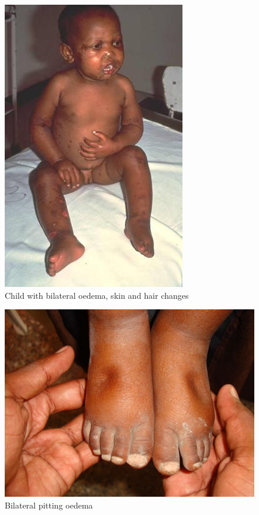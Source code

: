 \documentclass[12pt,]{book}
\theoremstyle{definition}
\theoremstyle{definition}
\theoremstyle{definition}
\theoremstyle{remark}
\begin{document}
\begin{figure}

{\centering \includegraphics{images/oedema01} 

}

\caption{Child with bilateral oedema, skin and hair changes}\label{fig:unnamed-chunk-1}
\end{figure}

\begin{figure}

{\centering \includegraphics{images/oedema02} 

}

\caption{Bilateral pitting oedema}\label{fig:unnamed-chunk-1}
\end{figure}
\end{document}
